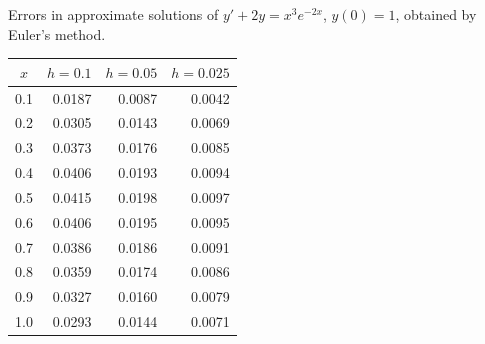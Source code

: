 \begin{examplesolution}
\begin{newtable}
  \label{table:3.1.2} Errors in approximate solutions of $y'+2y=x^{3}e^{-2x}$, $y(0)=1$, obtained by
  Euler's method.
  \begin{center}
    \begin{tabular}{|c|r|r|r|}
      \hline
      \multicolumn{1}{|c|}{$x$} & \multicolumn{1}{|c|}{$h=0.1$} & \multicolumn{1}{|c|}{$h=0.05$} & \multicolumn{1}{|c|}{$h=0.025$} \\
      \hline
      0.1                       & 0.0187                        & 0.0087                         & 0.0042                          \\
      0.2                       & 0.0305                        & 0.0143                         & 0.0069                          \\
      0.3                       & 0.0373                        & 0.0176                         & 0.0085                          \\
      0.4                       & 0.0406                        & 0.0193                         & 0.0094                          \\
      0.5                       & 0.0415                        & 0.0198                         & 0.0097                          \\
      0.6                       & 0.0406                        & 0.0195                         & 0.0095                          \\
      0.7                       & 0.0386                        & 0.0186                         & 0.0091                          \\
      0.8                       & 0.0359                        & 0.0174                         & 0.0086                          \\
      0.9                       & 0.0327                        & 0.0160                         & 0.0079                          \\
      1.0                       & 0.0293                        & 0.0144                         & 0.0071                          \\
      \hline
    \end{tabular}
  \end{center}
\end{newtable}
\end{examplesolution}

